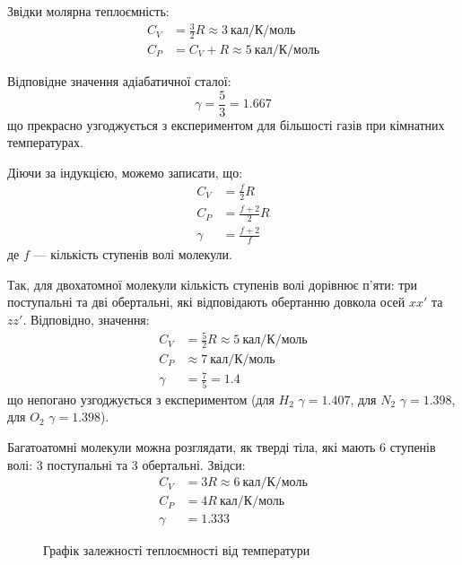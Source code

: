 Звідки молярна теплоємність:
\begin{align}
    C_{V} &= \frac{3}{2}R \approx 3\ \text{кал/К/моль} \label{eq:127.2} \\
    C_{P} &= C_{V} + R \approx 5\ \text{кал/К/моль} \label{eq:127.3}
\end{align}

Відповідне значення адіабатичної сталої:
\begin{equation}
    \gamma = \frac{5}{3} = 1.667
    \label{eq:127.4}
\end{equation}
що прекрасно узгоджується з експериментом для більшості газів при кімнатних температурах.

Діючи за індукцією, можемо записати, що:
\begin{align}
    C_{V} &= \frac{f}{2}R \label{eq:127.5} \\
    C_{P} &= \frac{f + 2}{2}R \label{eq:127.6} \\
    \gamma &= \frac{f + 2}{f} \label{eq:127.7}
\end{align}
де $f$ --- кількість ступенів волі молекули.

Так, для двохатомної молекули кількість ступенів волі дорівнює п'яти: три поступальні та дві
обертальні, які відповідають обертанню довкола осей $xx'$ та $zz'$. Відповідно, значення:
\begin{align*}
    C_{V} &= \frac{5}{2}R \approx 5\ \text{кал/К/моль} \\
    C_{P} &\approx 7\ \text{кал/К/моль} \\
    \gamma &= \frac{7}{5} = 1.4
\end{align*}
що непогано узгоджується з експериментом (для $H_{2}$ $\gamma = 1.407$, для $N_{2}$ $\gamma = 1.398$,
для $O_{2}$ $\gamma = 1.398$).

Багатоатомні молекули можна розглядати, як тверді тіла, які мають 6 ступенів волі: 3 поступальні та 3
обертальні. Звідси:
\begin{align*}
    C_{V} &= 3R \approx 6\ \text{кал/К/моль} \\
    C_{P} &= 4R\ \text{кал/К/моль} \\
    \gamma &= 1.333
\end{align*}

\begin{figure}[h]
    \centering
    \caption{Графік залежності теплоємності від температури}
    \label{fig:heat_capacity}
\end{figure}

